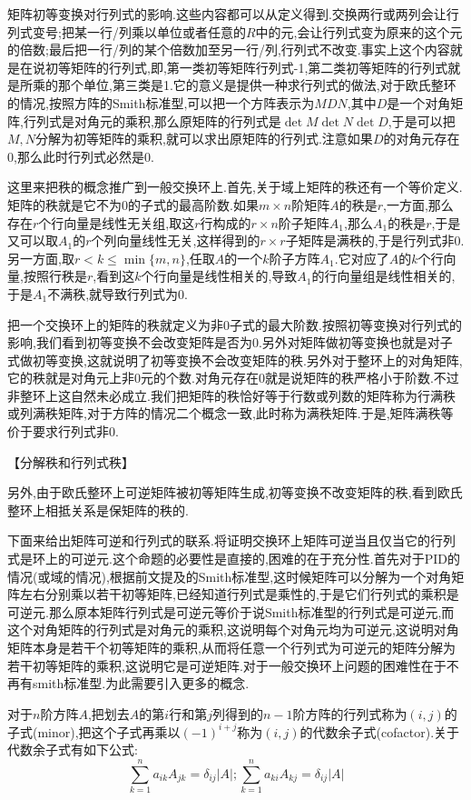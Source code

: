 矩阵初等变换对行列式的影响.这些内容都可以从定义得到.交换两行或两列会让行列式变号;把某一行/列乘以单位或者任意的$R$中的元,会让行列式变为原来的这个元的倍数;最后把一行/列的某个倍数加至另一行/列,行列式不改变.事实上这个内容就是在说初等矩阵的行列式,即,第一类初等矩阵行列式-1,第二类初等矩阵的行列式就是所乘的那个单位,第三类是1.它的意义是提供一种求行列式的做法,对于欧氏整环的情况,按照方阵的Smith标准型,可以把一个方阵表示为$MDN$,其中$D$是一个对角矩阵,行列式是对角元的乘积,那么原矩阵的行列式是$\det M\det N\det D$,于是可以把$M,N$分解为初等矩阵的乘积,就可以求出原矩阵的行列式.注意如果$D$的对角元存在0,那么此时行列式必然是0.

这里来把秩的概念推广到一般交换环上.首先,关于域上矩阵的秩还有一个等价定义.矩阵的秩就是它不为0的子式的最高阶数.如果$m\times n$阶矩阵$A$的秩是$r$,一方面,那么存在$r$个行向量是线性无关组,取这$r$行构成的$r\times n$阶子矩阵$A_1$,那么$A_1$的秩是$r$,于是又可以取$A_1$的$r$个列向量线性无关,这样得到的$r\times r$子矩阵是满秩的,于是行列式非0.另一方面,取$r<k\le\min\{m,n\}$,任取$A$的一个$k$阶子方阵$A_1$.它对应了$A$的$k$个行向量,按照行秩是$r$,看到这$k$个行向量是线性相关的,导致$A_1$的行向量组是线性相关的,于是$A_1$不满秩,就导致行列式为0.

把一个交换环上的矩阵的秩就定义为非0子式的最大阶数.按照初等变换对行列式的影响,我们看到初等变换不会改变矩阵是否为0.另外对矩阵做初等变换也就是对子式做初等变换,这就说明了初等变换不会改变矩阵的秩.另外对于整环上的对角矩阵,它的秩就是对角元上非0元的个数.对角元存在0就是说矩阵的秩严格小于阶数.不过非整环上这自然未必成立.我们把矩阵的秩恰好等于行数或列数的矩阵称为行满秩或列满秩矩阵,对于方阵的情况二个概念一致,此时称为满秩矩阵.于是,矩阵满秩等价于要求行列式非0.

【分解秩和行列式秩】

另外,由于欧氏整环上可逆矩阵被初等矩阵生成,初等变换不改变矩阵的秩,看到欧氏整环上相抵关系是保矩阵的秩的.

下面来给出矩阵可逆和行列式的联系.将证明交换环上矩阵可逆当且仅当它的行列式是环上的可逆元.这个命题的必要性是直接的,困难的在于充分性.首先对于PID的情况(或域的情况),根据前文提及的Smith标准型,这时候矩阵可以分解为一个对角矩阵左右分别乘以若干初等矩阵,已经知道行列式是乘性的,于是它们行列式的乘积是可逆元.那么原本矩阵行列式是可逆元等价于说Smith标准型的行列式是可逆元,而这个对角矩阵的行列式是对角元的乘积,这说明每个对角元均为可逆元,这说明对角矩阵本身是若干个初等矩阵的乘积,从而将任意一个行列式为可逆元的矩阵分解为若干初等矩阵的乘积,这说明它是可逆矩阵.对于一般交换环上问题的困难性在于不再有smith标准型.为此需要引入更多的概念.

对于$n$阶方阵$A$,把划去$A$的第$i$行和第$j$列得到的$n-1$阶方阵的行列式称为$(i,j)$的子式(minor),把这个子式再乘以$(-1)^{i+j}$称为$(i,j)$的代数余子式(cofactor).关于代数余子式有如下公式:
$$\sum_{k=1}^na_{ik}A_{jk}=\delta_{ij}|A|;\sum_{k=1}^na_{ki}A_{kj}=\delta_{ij}|A|$$

